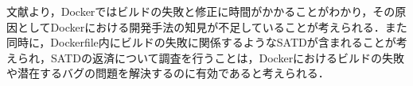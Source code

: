 
文献\cite{docker-failures}より，Dockerではビルドの失敗と修正に時間がかかることがわかり，その原因としてDockerにおける開発手法の知見が不足していることが考えられる．また同時に，Dockerfile内にビルドの失敗に関係するようなSATDが含まれることが考えられ，SATDの返済について調査を行うことは，Dockerにおけるビルドの失敗や潜在するバグの問題を解決するのに有効であると考えられる．